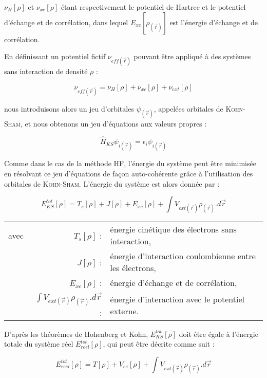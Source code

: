 	\noindent $\nu_{H}[\rho]$ et $\nu_{xc}[\rho]$ étant respectivement le potentiel de Hartree et le potentiel d'échange et de corrélation, dans lequel $E_{xc}[\rho_{(\vec{r})}]$ est l'énergie d'échange et de corrélation.
	
	En définissant un potentiel fictif $\nu_{eff(\vec{r})}$ pouvant être appliqué à des systèmes sans interaction de densité $\rho$ :
	
	\begin{equation}
	\nu_{eff(\vec{r})} = \nu_{H}[\rho] + \nu_{xc}[\rho] + \nu_{ext}[\rho]
	\end{equation}
	
	\noindent nous introduisons alors un jeu d'orbitales $\psi_{(\vec{r})}$, appelées orbitales de \textsc{Kohn-Sham}, et nous obtenons un jeu d'équations aux valeurs propres :
	
	\begin{equation}
	\hat{H}_{KS} \psi_{i(\vec{r})} = \epsilon_{i} \psi_{i(\vec{r})}
	\end{equation}
	
	Comme dans le cas de la méthode HF, l'énergie du système peut être minimisée en résolvant ce jeu d'équations de façon auto-cohérente grâce à l'utilisation des orbitales de \textsc{Kohn-Sham}. L'énergie du système est alors donnée par :
	
	\begin{equation}
	E_{KS}^{tot}[\rho] = T_{s}[\rho] + J[\rho] + E_{xc}[\rho] + \int V_{ext(\vec{r})}\rho_{(\vec{r})} .d\vec{r}
	\end{equation}
	
	\begin{flushleft}
		\begin{tabular}{@{}lrp{10cm}}
			avec & $T_{s}[\rho]$ : & énergie cinétique des électrons sans interaction, \\
			& $J[\rho]$ : & énergie d'interaction coulombienne entre les électrons, \\
			& $E_{xc}[\rho]$ : & énergie d'échange et de corrélation, \\
			& $\int V_{ext(\vec{r})}\rho_{(\vec{r})} .d\vec{r}$ : & énergie d'interaction avec le potentiel externe. 
		\end{tabular}
	\end{flushleft}
	
	D'après les théorèmes de Hohenberg et Kohn, $E_{KS}^{tot}[\rho]$ doit être égale à l'énergie totale du système réel $E_{reel}^{tot}[\rho]$, qui peut être décrite comme suit :
	
	\begin{equation}
	E_{reel}^{tot}[\rho] = T[\rho] + V_{ee}[\rho] + \int V_{ext(\vec{r})}\rho_{(\vec{r})} .d\vec{r}
	\end{equation}
	
